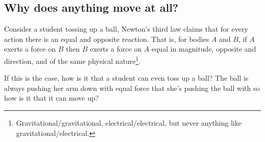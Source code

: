 \subsection{Why does anything move at all?}
Consider a student tossing up a ball, Newton's third law claims that for every action there is an equal and opposite reaction. That is, for bodies $A$ and $B$, if $A$ exerts a force on $B$ then $B$ exerts a force on $A$ equal in magnitude, opposite and direction, and of the same physical nature\footnote{Gravitational/gravitational, electrical/electrical, but never anything like gravitational/electrical.}. 

If this is the case, how is it that a student can even toss up a ball? The ball is always pushing her arm down with equal force that she's pushing the ball with so how is it that it can move up?
